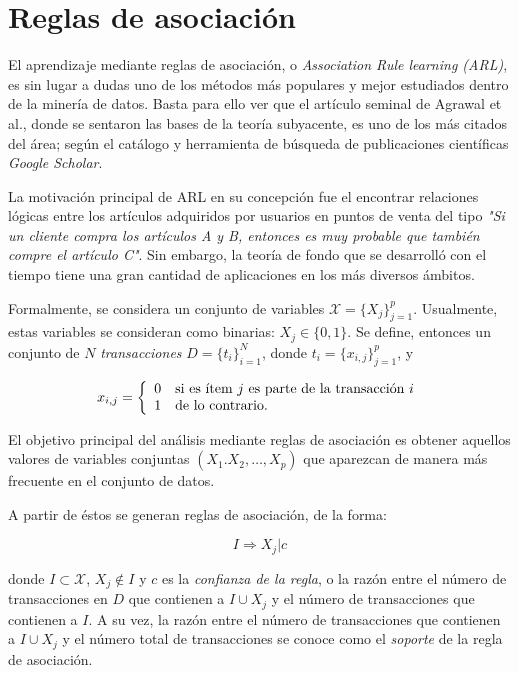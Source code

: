 \section{Reglas de asociación}

El aprendizaje mediante reglas de asociación, o \textit{Association Rule learning (ARL)}, es sin lugar a dudas uno de los métodos más populares y mejor estudiados dentro de la minería de datos. Basta para ello ver que el artículo seminal de Agrawal et al.\cite{agrawal1993mining}, donde se sentaron las bases de la teoría subyacente, es uno de los más citados del área; según el catálogo y herramienta de búsqueda de publicaciones científicas \textit{Google Scholar}.

La motivación principal de ARL en su concepción fue el encontrar relaciones lógicas entre los artículos adquiridos por usuarios en puntos de venta del tipo \textit{"Si un cliente compra los artículos A y B, entonces es muy probable que también compre el artículo C"}. Sin embargo, la teoría de fondo que se desarrolló con el tiempo tiene una gran cantidad de aplicaciones en los más diversos ámbitos.

Formalmente, se considera un conjunto de variables $\mathcal{X}=\{X_{j}\}^p_{j=1}$. Usualmente, estas variables se consideran como binarias: $X_j\in\{0,1\}$. Se define, entonces un conjunto de $N$ \textit{transacciones} $D=\{t_i\}^N_{i=1}$, donde $t_i=\{x_{i,j}\}^p_{j=1}$, y 

\[
x_{i,j}=
\left\{
\begin{array}{l l}
0 \quad \text{si es ítem $j$ es parte de la transacción $i$}\\
1 \quad \text{de lo contrario.}
\end{array}
\right.
\]

El objetivo principal del análisis mediante reglas de asociación es obtener aquellos valores de variables conjuntas $(X_1.X_2,\dots,X_p)$ que aparezcan de manera más frecuente en el conjunto de datos.

A partir de éstos se generan reglas de asociación, de la forma:

\[I \Rightarrow X_j\Big|c\]

donde $I\subset\mathcal{X}$, $X_j \notin I$ y $c$ es la \textit{confianza de la regla}, o la razón entre el número de transacciones en $D$ que contienen a $I \cup X_j$ y el número de transacciones que contienen a $I$. A su vez, la razón entre el número de transacciones que contienen a $I \cup X_j$ y el número total de transacciones se conoce como el \textit{soporte} de la regla de asociación.

